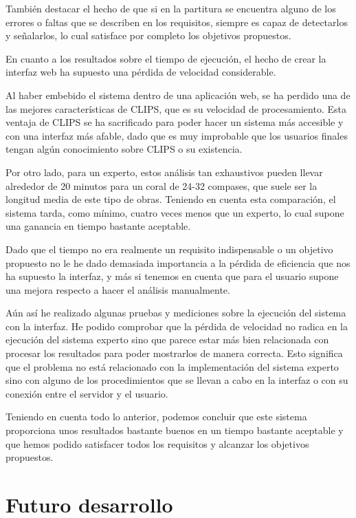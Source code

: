 También destacar el hecho de que si en la partitura se encuentra alguno de los errores o faltas que se describen en los requisitos, siempre es capaz de detectarlos y señalarlos, lo cual satisface por completo los objetivos propuestos.

\bigskip
En cuanto a los resultados sobre el tiempo de ejecución, el hecho de crear la interfaz web ha supuesto una pérdida de velocidad considerable. 

Al haber embebido el sistema dentro de una aplicación web, se ha perdido una de las mejores características de CLIPS, que es su velocidad de procesamiento. Esta ventaja de CLIPS se ha sacrificado para poder hacer un sistema más accesible y con una interfaz más afable, dado que es muy improbable que los usuarios finales tengan algún conocimiento sobre CLIPS o su existencia. 

Por otro lado, para un experto, estos análisis tan exhaustivos pueden llevar alrededor de 20 minutos para un coral de 24-32 compases, que suele ser la longitud media de este tipo de obras. Teniendo en cuenta esta comparación, el sistema tarda, como mínimo, cuatro veces menos que un experto, lo cual supone una ganancia en tiempo bastante aceptable.

Dado que el tiempo no era realmente un requisito indispensable o un objetivo propuesto no le he dado demasiada importancia a la pérdida de eficiencia que nos ha supuesto la interfaz, y más si tenemos en cuenta que para el usuario supone una mejora respecto a hacer el análisis manualmente. 

Aún así he realizado algunas pruebas y mediciones sobre la ejecución del sistema con la interfaz. He podido comprobar que la pérdida de velocidad no radica en la ejecución del sistema experto sino que parece estar más bien relacionada con procesar los resultados para poder mostrarlos de manera correcta. Esto significa que el problema no está relacionado con la implementación del sistema experto sino con alguno de los procedimientos que se llevan a cabo en la interfaz o con su conexión entre el servidor y el usuario.

\bigskip

Teniendo en cuenta todo lo anterior, podemos concluir que este sistema proporciona unos resultados bastante buenos en un tiempo bastante aceptable y que hemos podido satisfacer todos los requisitos y alcanzar los objetivos propuestos.

\section{Futuro desarrollo}

